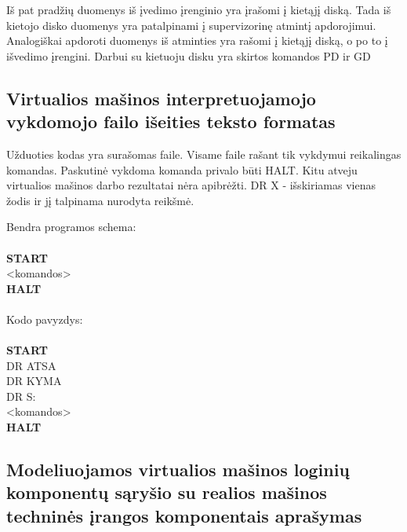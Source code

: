 Iš pat pradžių duomenys iš įvedimo įrenginio yra įrašomi į kietąjį diską. Tada iš kietojo disko duomenys yra patalpinami į supervizorinę atmintį apdorojimui. 
Analogiškai apdoroti duomenys iš atminties yra rašomi į kietąjį diską, o po to į išvedimo įrengini.
Darbui su kietuoju disku yra skirtos komandos PD ir GD

\subsection{Virtualios mašinos interpretuojamojo vykdomojo failo išeities 
teksto formatas}

Užduoties kodas yra surašomas faile. Visame faile rašant tik vykdymui reikalingas
komandas. Paskutinė vykdoma komanda privalo būti HALT. Kitu atveju virtualios mašinos darbo
rezultatai nėra apibrėžti.
DR X - išskiriamas vienas žodis ir jį talpinama nurodyta reikšmė.

Bendra programos schema:\\
\\\textbf{START}\\
<komandos>\\
\textbf{HALT}\\
\\
Kodo pavyzdys:\\
\\\textbf{START}\\
DR ATSA\\
DR KYMA\\
DR S:  \\


<komandos>\\
\textbf{HALT}

\subsection{Modeliuojamos virtualios mašinos loginių komponentų sąryšio su 
realios mašinos techninės įrangos komponentais aprašymas}

